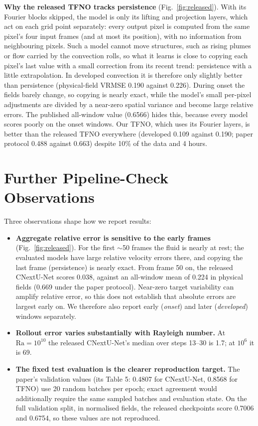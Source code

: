 \documentclass[11pt]{article}
\begin{document}
\textbf{Why the released TFNO tracks persistence} (Fig.~\ref{fig:released}). With its Fourier blocks
skipped, the model is only its lifting and projection layers, which act on each grid point separately: every
output pixel is computed from the same pixel's four input frames (and at most its position), with no information
from neighbouring pixels. Such a model cannot move structures, such as rising plumes or flow carried by the
convection rolls, so what it learns is close to copying each pixel's last value with a small correction from its
recent trend: persistence with a little extrapolation. In developed convection it is therefore only slightly
better than persistence (physical-field VRMSE 0.190 against 0.226). During onset the fields barely change, so
copying is nearly exact, while the model's small per-pixel adjustments are divided by a near-zero spatial variance
and become large relative errors. The published all-window value (0.6566) hides this, because every model scores
poorly on the onset windows. Our TFNO, which uses its Fourier layers, is
better than the released TFNO everywhere (developed 0.109 against 0.190; paper protocol 0.488 against 0.663)
despite 10\% of the data and 4 hours.

\FloatBarrier
\section{Further Pipeline-Check Observations}
\label{app:pipeline}

Three observations shape how we report results:
\begin{itemize}
    \item \textbf{Aggregate relative error is sensitive to the early frames} (Fig.~\ref{fig:released}). For the
    first $\sim$50 frames the fluid is nearly at rest; the evaluated models have large relative velocity errors
    there, and copying the last frame (persistence) is nearly exact. From frame 50 on, the released CNextU-Net
    scores 0.038, against an all-window mean of 0.224 in physical fields (0.669 under the paper protocol).
    Near-zero target variability can amplify relative error, so this does not establish that absolute errors are
    largest early on. We therefore also report early (\emph{onset}) and later (\emph{developed}) windows
    separately.
    \item \textbf{Rollout error varies substantially with Rayleigh number.} At $\mathrm{Ra}=10^{10}$ the released
    CNextU-Net's median over steps 13--30 is 1.7; at $10^{6}$ it is 69.
    \item \textbf{The fixed test evaluation is the clearer reproduction target.} The paper's validation values
    (its Table 5: 0.4807 for CNextU-Net, 0.8568 for TFNO) use 20 random batches per epoch; exact agreement would
    additionally require the same sampled batches and evaluation state. On the full validation split, in
    normalised fields, the released checkpoints score 0.7006 and 0.6754, so these values are not reproduced.
\end{itemize}
\end{document}
